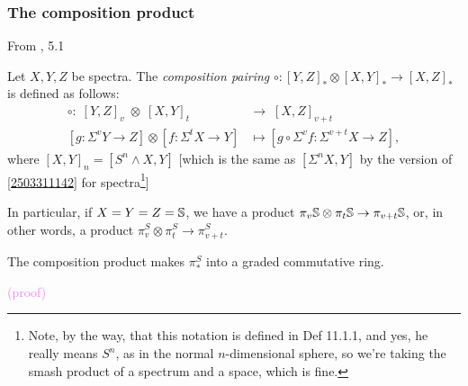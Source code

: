 \documentclass{MetricNotes2023}
\def\bb{\ensuremath\mathbb}
\def\textcolour{\textcolor}
\begin{document}
\subsubsection{The composition product}

From \autocite{ass}, 5.1

\begin{definition}
Let \(X, Y, Z\) be spectra. The \textit{composition pairing} \(\circ : [Y, Z]_* \otimes [X,Y]_* \to [X,Z]_*\) is defined as follows: 
\begin{align*}
\circ :\; [Y, Z]_v\; \otimes \;[X,Y]_t\; &\to\; [X,Z]_{v+t}\\
[g : \Sigma^v Y \to Z]\otimes [f : \Sigma^t X\to Y] &\mapsto [g \circ \Sigma^v f : \Sigma^{v+t}X\to Z],
\end{align*}
where \([X,Y]_n=[S^n\wedge X, Y]\) [which is the same as \([\Sigma^n X, Y]\) by the version of \ref{2503311142} for spectra\footnote{Note, by the way, that this notation is defined in \autocite{rognes2} Def 11.1.1, and yes, he really means \(S^n\), as in the normal \(n\)-dimensional sphere, so we're taking the smash product of a spectrum and a space, which is fine.}]
\end{definition}

In particular, if \(X=Y=Z=\bb{S}\), we have a product \(\pi_v \bb{S}\otimes \pi_t \bb{S}\to \pi_{v+t}\bb{S}\), or, in other words, a product \(\pi_v^S\otimes \pi_t^S\to \pi_{v+t}^S\). 

\begin{lemma}
The composition product makes \(\pi_*^S\) into a graded commutative ring. 
\end{lemma}

\textcolour{violet}{(proof)}
\end{document}
